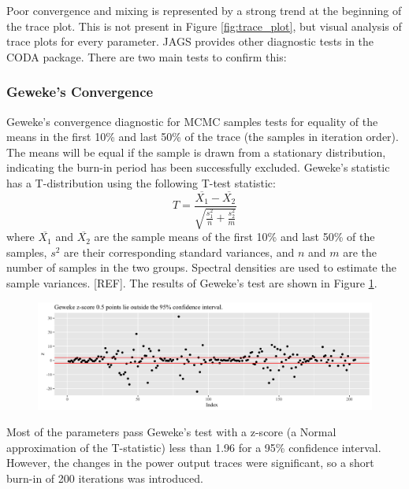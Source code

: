 \documentclass[a4paper, 12pt]{article}
\begin{document}
Poor convergence and mixing is represented by a strong trend at the beginning of the trace plot. This is not present in Figure \ref{fig:trace_plot}, but visual analysis of trace plots for every parameter.
JAGS provides other diagnostic tests in the CODA package. There are two main tests to confirm this:

\subsubsection{Geweke's Convergence}
Geweke's convergence diagnostic for MCMC samples tests for equality of the means in the first 10\% and last 50\% of the trace (the samples in iteration order). The means will be equal if the sample is drawn from a stationary distribution, indicating the burn-in period has been successfully excluded. Geweke's statistic has a T-distribution using the following T-test statistic:
\begin{equation}
T=\frac{\overline{X_1}-\overline{X_2}}{\sqrt{\frac{s_1^2}{n} + \frac{s_2^2}{m}}}
\end{equation}
where $\overline{X_1}$ and $\overline{X_2}$ are the sample means of the first 10\% and last 50\% of the samples, $s^2$ are their corresponding standard variances, and $n$ and $m$ are the number of samples in the two groups. Spectral densities are used to estimate the sample variances. [REF]. The results of Geweke's test are shown in Figure \ref{fig:geweke}.

\begin{figure}
  \centering
  \includegraphics[width=\linewidth]{media/geweke}
  \label{fig:geweke}
\end{figure}

Most of the parameters pass Geweke's test with a z-score (a Normal approximation of the T-statistic) less than 1.96 for a 95\% confidence interval. However, the changes in the power output traces were significant, so a short burn-in of 200 iterations was introduced.
\end{document}
